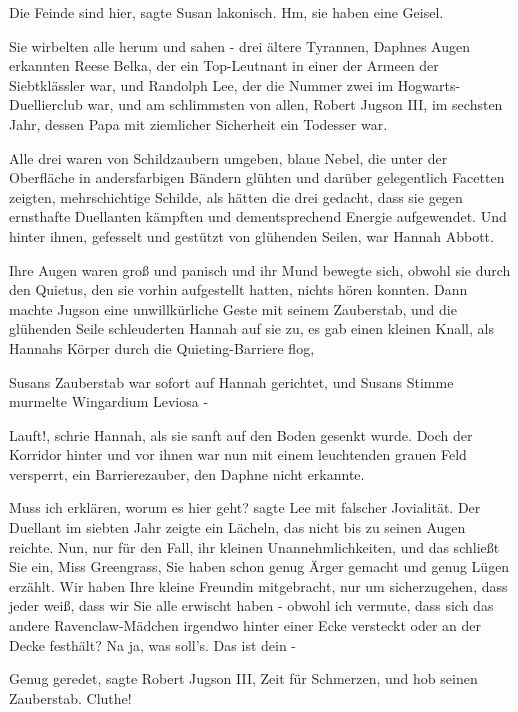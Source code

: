 \glqq{}Die Feinde sind hier\grqq{}, sagte Susan lakonisch. \glqq{}Hm, sie haben
eine Geisel.\grqq{}

Sie wirbelten alle herum und sahen - drei ältere Tyrannen, Daphnes Augen
erkannten Reese Belka, der ein Top-Leutnant in einer der Armeen der
Siebtklässler war, und Randolph Lee, der die Nummer zwei im
Hogwarts-Duellierclub war, und am schlimmsten von allen, Robert Jugson III, im
sechsten Jahr, dessen Papa mit ziemlicher Sicherheit ein Todesser war.

Alle drei waren von Schildzaubern umgeben, blaue Nebel, die unter der Oberfläche
in andersfarbigen Bändern glühten und darüber gelegentlich Facetten zeigten,
mehrschichtige Schilde, als hätten die drei gedacht, dass sie gegen ernsthafte
Duellanten kämpften und dementsprechend Energie aufgewendet. Und hinter ihnen,
gefesselt und gestützt von glühenden Seilen, war Hannah Abbott.

Ihre Augen waren groß und panisch und ihr Mund bewegte sich, obwohl sie durch
den Quietus, den sie vorhin aufgestellt hatten, nichts hören konnten. Dann
machte Jugson eine unwillkürliche Geste mit seinem Zauberstab, und die glühenden
Seile schleuderten Hannah auf sie zu, es gab einen kleinen Knall, als Hannahs
Körper durch die Quieting-Barriere flog,

Susans Zauberstab war sofort auf Hannah gerichtet, und Susans Stimme murmelte
\glqq{}Wingardium Leviosa\grqq{} -

\glqq{}Lauft!\grqq{}, schrie Hannah, als sie sanft auf den Boden gesenkt wurde.
Doch der Korridor hinter und vor ihnen war nun mit einem leuchtenden grauen Feld
versperrt, ein Barrierezauber, den Daphne nicht erkannte.

\glqq{}Muss ich erklären, worum es hier geht?\grqq{} sagte Lee mit falscher
Jovialität. Der Duellant im siebten Jahr zeigte ein Lächeln, das nicht bis zu
seinen Augen reichte. \glqq{}Nun, nur für den Fall, ihr kleinen
Unannehmlichkeiten, und das schließt Sie ein, Miss Greengrass, Sie haben schon
genug Ärger gemacht und genug Lügen erzählt. Wir haben Ihre kleine Freundin
mitgebracht, nur um sicherzugehen, dass jeder weiß, dass wir Sie alle erwischt
haben - obwohl ich vermute, dass sich das andere Ravenclaw-Mädchen irgendwo
hinter einer Ecke versteckt oder an der Decke festhält? Na ja, was soll's. Das
ist dein -\grqq{}

\glqq{}Genug geredet\grqq{}, sagte Robert Jugson III, \glqq{}Zeit für
Schmerzen\grqq{}, und hob seinen Zauberstab. \glqq{}Cluthe!\grqq{}


